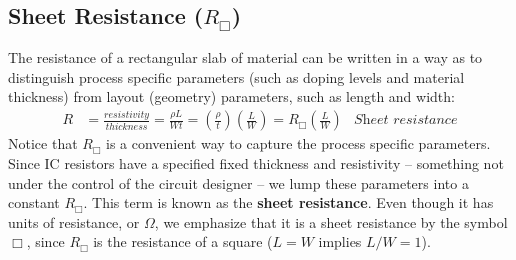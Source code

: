 \subsection{Sheet Resistance (\texorpdfstring{$R_{\Box}$}{})} \label{sec:sheetR}
The resistance of a rectangular slab of material can be written in a way as to distinguish process specific parameters (such as doping levels and material thickness) from layout (geometry) parameters, such as length and width: 
    \begin{align} 
        R &= \frac{resistivity}{thickness} = \frac{{\rho L}}{{Wt}} = \left( {\frac{\rho }{t}} \right)\left( {\frac{L}{W}} \right)
        = {R_{\Box}}\left( {\frac{L}{W}} \right) &\textit{Sheet resistance}
    \end{align}
Notice that $R_{\Box}$ is a convenient way to capture the process specific parameters.  Since IC resistors have a specified fixed thickness and resistivity – something not under the control of the circuit designer – we lump these parameters into a constant $R_{\Box}$.  This term is known as the \textbf{sheet resistance}.  Even though it has units of resistance, or $\Omega$, we emphasize that it is a sheet resistance by the symbol $\Box$, since $R_{\Box}$ is the resistance of a square ($L = W$ implies $L/W = 1$).  
